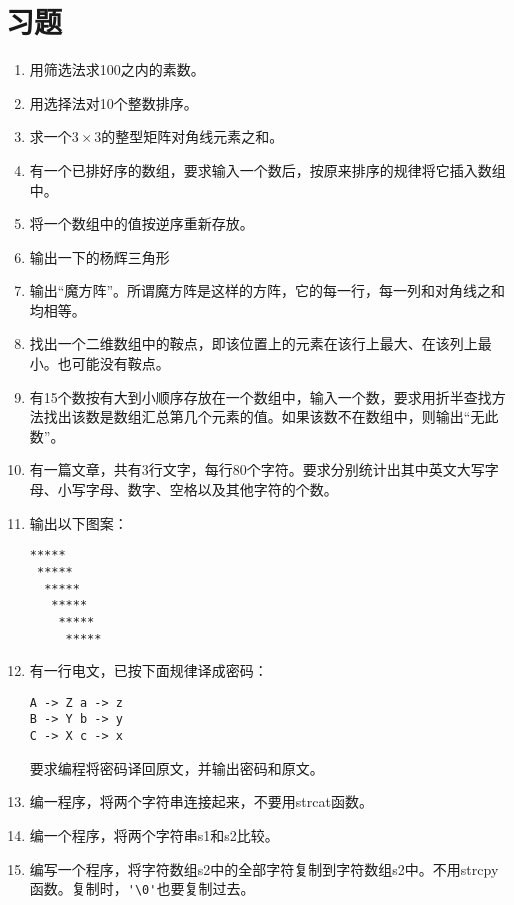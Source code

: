 \section{习题}
\begin{enumerate}
	\item 用筛选法求100之内的素数。
	\item 用选择法对10个整数排序。
	\item 求一个$3 \times 3$的整型矩阵对角线元素之和。
	\item 有一个已排好序的数组，要求输入一个数后，按原来排序的规律将它插入数组中。
	\item 将一个数组中的值按逆序重新存放。
	\item 输出一下的杨辉三角形
	\item 输出“魔方阵”。所谓魔方阵是这样的方阵，它的每一行，每一列和对角线之和均相等。
	\item 找出一个二维数组中的鞍点，即该位置上的元素在该行上最大、在该列上最小。也可能没有鞍点。
	\item 有15个数按有大到小顺序存放在一个数组中，输入一个数，要求用折半查找方法找出该数是数组汇总第几个元素的值。如果该数不在数组中，则输出“无此数”。
	\item 有一篇文章，共有3行文字，每行80个字符。要求分别统计出其中英文大写字母、小写字母、数字、空格以及其他字符的个数。
	\item 输出以下图案：
		\begin{lstlisting}
*****
 *****
  *****
   *****
    *****
     *****
		\end{lstlisting}
	\item 有一行电文，已按下面规律译成密码：
		\begin{lstlisting}
A -> Z a -> z
B -> Y b -> y
C -> X c -> x
		\end{lstlisting}
		要求编程将密码译回原文，并输出密码和原文。
	\item 编一程序，将两个字符串连接起来，不要用strcat函数。
	\item 编一个程序，将两个字符串s1和s2比较。
	\item 编写一个程序，将字符数组s2中的全部字符复制到字符数组s2中。不用strcpy函数。复制时，\verb|'\0'|也要复制过去。
\end{enumerate}
